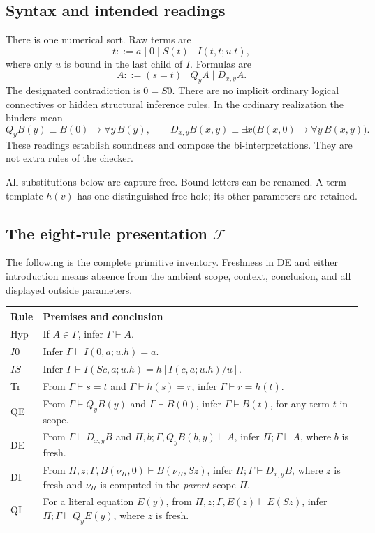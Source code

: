 \documentclass[11pt]{article}
\newcommand{\Fcal}{\mathcal F}
\newcommand{\newest}{\nu_{\Pi}}
\begin{document}
\subsection{Syntax and intended readings}

There is one numerical sort. Raw terms are
\[
 t ::= a\mid 0\mid S(t)\mid I(t,t;u.t),
\]
where only \(u\) is bound in the last child of \(I\). Formulas are
\[
 A ::= (s=t)\mid Q_y A\mid D_{x,y}A.
\]
The designated contradiction is \(0=S0\).
There are no implicit ordinary logical connectives or hidden structural
inference rules. In the ordinary realization the binders mean
\[
 Q_y B(y) \equiv B(0)\to\forall y\,B(y),
 \qquad
 D_{x,y}B(x,y)\equiv
 \exists x\bigl(B(x,0)\to\forall y\,B(x,y)\bigr).
\]
These readings establish soundness and compose the bi-interpretations.
They are not extra rules of the checker.

All substitutions below are capture-free. Bound letters can be renamed.
A term template \(h(v)\) has one distinguished free hole; its other
parameters are retained.

\Needspace{0.48\textheight}
\subsection{The eight-rule presentation \texorpdfstring{\(\Fcal\)}{F}}

The following is the complete primitive inventory.
Freshness in DE and either introduction means absence from the ambient
scope, context, conclusion, and all displayed outside parameters.

\begin{longtable}{@{}p{}p{}@{}}
\toprule
Rule & Premises and conclusion\\
\midrule
Hyp &
If \(A\in\Gamma\), infer \(\Gamma\vdash A\).\\[5pt]
\(I0\) &
Infer \(\Gamma\vdash I(0,a;u.h)=a\).\\[5pt]
\(IS\) &
Infer \(\Gamma\vdash I(Sc,a;u.h)=h[I(c,a;u.h)/u]\).\\[5pt]
Tr &
From \(\Gamma\vdash s=t\) and \(\Gamma\vdash h(s)=r\), infer
\(\Gamma\vdash r=h(t)\).\\[5pt]
QE &
From \(\Gamma\vdash Q_yB(y)\) and \(\Gamma\vdash B(0)\), infer
\(\Gamma\vdash B(t)\), for any term \(t\) in scope.\\[5pt]
DE &
From \(\Gamma\vdash D_{x,y}B\) and
\(\Pi,b;\Gamma,Q_yB(b,y)\vdash A\), infer
\(\Pi;\Gamma\vdash A\), where \(b\) is fresh.\\[5pt]
DI &
From
\(\Pi,z;\Gamma,B(\newest,0)\vdash B(\newest,Sz)\), infer
\(\Pi;\Gamma\vdash D_{x,y}B\), where \(z\) is fresh and
\(\newest\) is computed in the \emph{parent} scope \(\Pi\).\\[5pt]
QI &
For a literal equation \(E(y)\), from
\(\Pi,z;\Gamma,E(z)\vdash E(Sz)\), infer
\(\Pi;\Gamma\vdash Q_yE(y)\), where \(z\) is fresh.\\
\bottomrule
\end{longtable}
\end{document}
